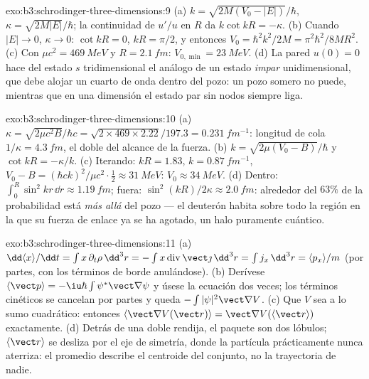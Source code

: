\begin{solution}{exo:b3:schrodinger-three-dimensions:9}
(a) $k = \sqrt{2M(V_0 - |E|)}/\hbar$, $\kappa = \sqrt{2M|E|}/\hbar$;
la continuidad de $u'/u$ en $R$ da $k\cot kR = -\kappa$. (b) Cuando $|E|
\to 0$, $\kappa \to 0$: $\cot kR = 0$, $kR = \pi/2$, y entonces $V_0 =
\hbar^2k^2/2M = \pi^2\hbar^2/8MR^2$. (c) Con $\mu c^2 =
\qty{469}{MeV}$ y $R = \qty{2.1}{fm}$: $V_{0,\min} = \qty{23}{MeV}$.
(d) La pared $u(0) = 0$ hace del estado $s$ tridimensional el análogo de un
estado \emph{impar} unidimensional, que debe alojar un cuarto de onda dentro
del pozo: un pozo somero no puede, mientras que en una dimensión el estado
par sin nodos siempre liga.
\end{solution}

\begin{solution}{exo:b3:schrodinger-three-dimensions:10}
(a) $\kappa = \sqrt{2\mu c^2B}/\hbar c = \sqrt{2 \times 469 \times
2.22}/197.3 = \qty{0.231}{fm^{-1}}$: longitud de cola $1/\kappa =
\qty{4.3}{fm}$, el doble del alcance de la fuerza. (b) $k =
\sqrt{2\mu(V_0 - B)}/\hbar$ y $\cot kR = -\kappa/k$. (c) Iterando:
$kR = 1.83$, $k = \qty{0.87}{fm^{-1}}$, $V_0 - B = (\hbar ck)^2/\mu
c^2\cdot\tfrac12 \approx \qty{31}{MeV}$: $V_0 \approx \qty{34}{MeV}$.
(d) Dentro: $\int_0^R\sin^2kr\,\dd r \approx \qty{1.19}{fm}$;
fuera: $\sin^2(kR)/2\kappa \approx \qty{2.0}{fm}$: alrededor del $63\%$ de
la probabilidad está \emph{más allá} del pozo --- el deuterón habita sobre
todo la región en la que su fuerza de enlace ya se ha agotado, un halo
puramente cuántico.
\end{solution}

\begin{solution}{exo:b3:schrodinger-three-dimensions:11}
(a) $\dd\langle x\rangle/\dd t = \int x\,\partial_t\rho\,\dd^3r =
-\int x\operatorname{div}\vect\jmath\,\dd^3r = \int j_x\,\dd^3r =
\langle p_x\rangle/m$ (por partes, con los términos de borde anulándose).
(b) Derívese $\langle\vect p\rangle = -\iu\hbar\int\psi^*\vect\nabla
\psi$ y úsese la ecuación dos veces; los términos cinéticos se cancelan por
partes y queda $-\int|\psi|^2\vect\nabla V$. (c) Que $V$ sea a lo sumo
cuadrático: entonces $\langle\vect\nabla V(\vect r)\rangle = \vect\nabla V(\langle
\vect r\rangle)$ exactamente. (d) Detrás de una doble rendija, el paquete
son dos lóbulos; $\langle\vect r\rangle$ se desliza por el eje de simetría,
donde la partícula prácticamente nunca aterriza: el promedio describe el
centroide del conjunto, no la trayectoria de nadie.
\end{solution}

